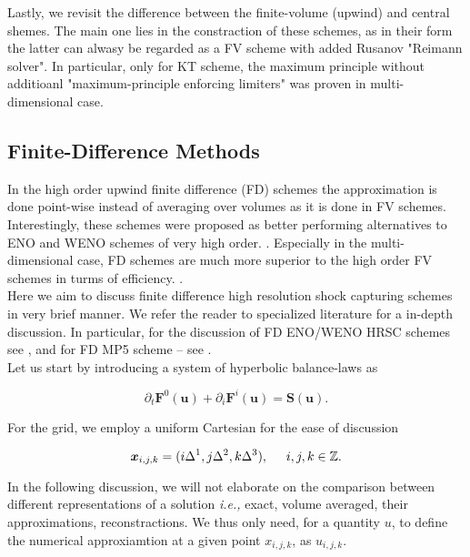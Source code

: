 \documentclass[11pt,a4paper,headinclude=true,DIV=14,BCOR=8mm,chapterprefix,listof=totoc,twoside,openright,abstracton]{scrbook}
\begin{document}
Lastly, we revisit the difference between the finite-volume (upwind) and central shemes. The main one lies in the constraction of these schemes, as in their form the latter can alwasy be regarded as a FV scheme with added Rusanov "Reimann solver". In particular, only for KT scheme, the maximum principle without additioanl "maximum-principle enforcing limiters" was proven in multi-dimensional case. \\


\subsection{Finite-Difference Methods}

In the high order upwind finite difference (FD) schemes the approximation is done point-wise instead of averaging over volumes as it is done in FV schemes. Interestingly, these schemes were proposed as better performing alternatives to ENO and WENO schemes of very high order. \cite{Shu:1988,Shu:1989,Jiang:1996}. Especially in the multi-dimensional case, FD schemes are much more superior to the high order FV schemes in turms of efficiency. \cite{Shu:1999,Shu:2003}. \\

Here we aim to discuss finite difference high resolution shock capturing schemes in very brief manner. We refer the reader to specialized literature for a in-depth discussion. In particular, for the discussion of FD ENO/WENO HRSC schemes see \cite{Shu:1999}, and for FD MP5 scheme -- see \cite{Mignone:2010}. \\

Let us start by introducing a system of hyperbolic balance-laws as

\begin{equation}
    \partial_t\boldsymbol{F}^0(\boldsymbol{u}) + \partial_i\boldsymbol{F}^i(\boldsymbol{u}) = \boldsymbol{S}(\boldsymbol{u}).
    \label{eq:theory:fd:hypsys}
\end{equation}

For the grid, we employ a uniform Cartesian for the ease of discussion 

\begin{equation}
    \boldsymbol{x}_{i,j,k} = (i\Delta^1, j\Delta^2, k\Delta^3), \hspace{5mm} i,j,k\in \mathbb{Z}.
\end{equation}

In the following discussion, we will not elaborate on the comparison between different representations of a solution \textit{i.e.,} exact, volume averaged, their approximations, reconstractions. We thus only need, for a quantity $u$, to define the numerical approxiamtion at a given point $x_{i,j,k}$, as $u_{i,j,k}$. 
\end{document}
